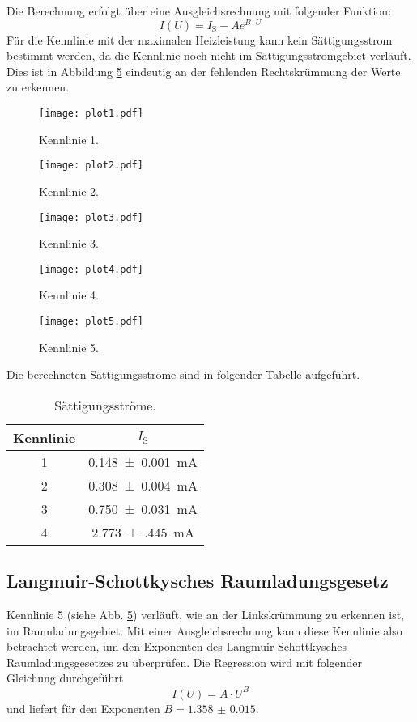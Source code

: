 Die Berechnung erfolgt über eine Ausgleichsrechnung mit folgender Funktion:
\begin{equation}
  I(U) = I_\text{S} - A e^{B \cdot U}
\end{equation}
Für die Kennlinie mit der maximalen Heizleistung kann kein Sättigungsstrom bestimmt werden, da die Kennlinie noch nicht im Sättigungsstromgebiet verläuft.
Dies ist in Abbildung \ref{fig:plot5} eindeutig an der fehlenden Rechtskrümmung der Werte zu erkennen.
\begin{figure}
  \centering
  \texttt{[image: plot1.pdf]}
  \caption{Kennlinie 1.}
  \label{fig:plot1}
\end{figure}
\begin{figure}
  \centering
  \texttt{[image: plot2.pdf]}
  \caption{Kennlinie 2.}
  \label{fig:plot2}
\end{figure}
\begin{figure}
  \centering
  \texttt{[image: plot3.pdf]}
  \caption{Kennlinie 3.}
  \label{fig:plot3}
\end{figure}
\begin{figure}
  \centering
  \texttt{[image: plot4.pdf]}
  \caption{Kennlinie 4.}
  \label{fig:plot4}
\end{figure}
\begin{figure}
  \centering
  \texttt{[image: plot5.pdf]}
  \caption{Kennlinie 5.}
  \label{fig:plot5}
\end{figure}
\noindent
Die berechneten Sättigungsströme sind in folgender Tabelle aufgeführt.
\begin{table}
\centering
\caption{Sättigungsströme.}
\label{tab:a}
\begin{tabular}{c c}
\toprule
Kennlinie & $I_\text{S}$ \\
\midrule
1 & \SI{0.148(1)}{\milli\ampere} \\
2 & \SI{0.308(4)}{\milli\ampere} \\
3 & \SI{0.750(31)}{\milli\ampere} \\
4 & \SI{2.773(445)}{\milli\ampere} \\
\bottomrule
\end{tabular}
\end{table}


\subsection{Langmuir-Schottkysches Raumladungsgesetz}
\label{sec:expo}

Kennlinie 5 (siehe Abb. \ref{fig:plot5}) verläuft, wie an der Linkskrümmung zu erkennen ist, im Raumladungsgebiet.
Mit einer Ausgleichsrechnung kann diese Kennlinie also betrachtet werden, um den Exponenten des Langmuir-Schottkysches Raumladungsgesetzes zu überprüfen.
Die Regression wird mit folgender Gleichung durchgeführt
\begin{equation}
  I(U) = A \cdot U^B
\end{equation}
und liefert für den Exponenten $B = \num{1.358(15)}$.

